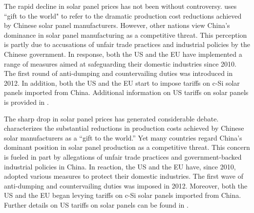 \documentclass[12pt, letter]{article}
\begin{document}
The rapid decline in solar panel prices has not been without controversy. \citet{nemet2019solar} uses ``gift to the world" to refer to the dramatic production cost reductions achieved by Chinese solar panel manufacturers. However, other nations view China's dominance in solar panel manufacturing as a competitive threat. This perception is partly due to accusations of unfair trade practices and industrial policies by the Chinese government. In response, both the US and the EU have implemented a range of measures aimed at safeguarding their domestic industries since 2010. The first round of anti-dumping and countervailing duties was introduced in 2012. In addition, both the US and the EU start to impose tariffs on c-Si solar panels imported from China. Additional information on US tariffs on solar panels is provided in \citet{bollinger2025strategic}.

 The sharp drop in solar panel prices has generated considerable debate. \citet{nemet2019solar} characterizes the substantial reductions in production costs achieved by Chinese solar manufacturers as a “gift to the world.” Yet many countries regard China’s dominant position in solar panel production as a competitive threat. This concern is fueled in part by allegations of unfair trade practices and government-backed industrial policies in China. In reaction, the US and the EU have, since 2010, adopted various measures to protect their domestic industries. The first wave of anti-dumping and countervailing duties was imposed in 2012. Moreover, both the US and the EU began levying tariffs on c-Si solar panels imported from China. Further details on US tariffs on solar panels can be found in \citet{bollinger2025strategic}.
 
\end{document}
